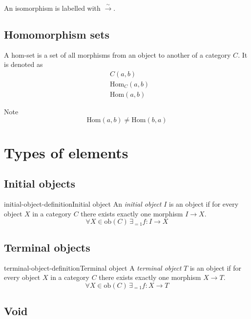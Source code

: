 \documentclass[preview]{standalone}
\begin{document}
An isomorphism is labelled with \(\xrightarrow{\sim}\).

\subsection{Homomorphism sets} %

A hom-set is a set of all morphisms from an object to another
of a category \(C\).
It is denoted as
\begin{align*}
    &C(a, b) \\
    &\text{Hom}_C(a, b) \\
    &\text{Hom}(a, b)
\end{align*}

Note
\[
    \text{Hom}(a, b) \neq \text{Hom}(b, a)
\]

\section{Types of elements}

\subsection{Initial objects}

\begin{snippetdefinition}{initial-object-definition}{Initial object}
    An \textit{initial object} \(I\) is an object if
    for every object \(X\) in a category \(C\)
    there exists exactly one morphism \(I\to X\).
    \[
        \forall X\in \text{ob}(C) \,\exists_{=1}f\colon I\to X
    \]
\end{snippetdefinition}

\subsection{Terminal objects}

\begin{snippetdefinition}{terminal-object-definition}{Terminal object}
    A \textit{terminal object} \(T\) is an object if
    for every object \(X\) in a category \(C\)
    there exists exactly one morphism \(X\to T\).
    \[
        \forall X\in \text{ob}(C) \,\exists_{=1}f\colon X\to T
    \]
\end{snippetdefinition}

\subsection{Void}
\end{document}
